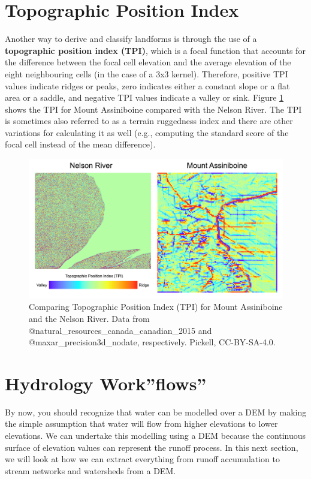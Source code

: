 \documentclass[
]{book}
\begin{document}
\hypertarget{topographic-position-index}{%
\section{Topographic Position Index}\label{topographic-position-index}}

Another way to derive and classify landforms is through the use of a \textbf{topographic position index (TPI)}, which is a focal function that accounts for the difference between the focal cell elevation and the average elevation of the eight neighbouring cells (in the case of a 3x3 kernel). Therefore, positive TPI values indicate ridges or peaks, zero indicates either a constant slope or a flat area or a saddle, and negative TPI values indicate a valley or sink. Figure \ref{fig:9-mount-assiniboine-nelson-river-topographic-position-index} shows the TPI for Mount Assiniboine compared with the Nelson River. The TPI is sometimes also referred to as a terrain ruggedness index and there are other variations for calculating it as well (e.g., computing the standard score of the focal cell instead of the mean difference).

\begin{figure}
\includegraphics[width=0.75\linewidth]{images/09-mount-assiniboine-nelson-river-topographic-position-index} \caption{Comparing Topographic Position Index (TPI) for Mount Assiniboine and the Nelson River. Data from @natural_resources_canada_canadian_2015 and @maxar_precision3d_nodate, respectively. Pickell, CC-BY-SA-4.0.}\label{fig:9-mount-assiniboine-nelson-river-topographic-position-index}
\end{figure}

\hypertarget{hydrology-workflows}{%
\section{Hydrology Work''flows''}\label{hydrology-workflows}}

By now, you should recognize that water can be modelled over a DEM by making the simple assumption that water will flow from higher elevations to lower elevations. We can undertake this modelling using a DEM because the continuous surface of elevation values can represent the runoff process. In this next section, we will look at how we can extract everything from runoff accumulation to stream networks and watersheds from a DEM.
\end{document}
